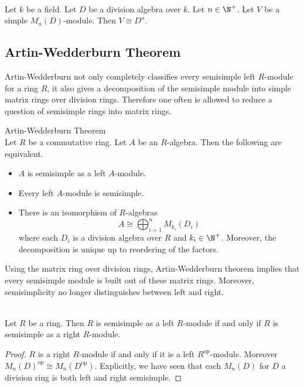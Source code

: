 \documentclass[a4paper]{article}
\begin{document}
\begin{prp}{}{}\\
Let $k$ be a field. Let $D$ be a division algebra over $k$. Let $n\in\N^+$. Let $V$ be a simple $M_n(D)$-module. Then $V\cong D^n$. 
\end{prp}

\subsection{Artin-Wedderburn Theorem}
Artin-Wedderburn not only completely classifies every semisimple left $R$-module for a ring $R$, it also gives a decomposition of the semisimple module into simple matrix rings over division rings. Therefore one often is allowed to reduce a question of semisimple rings into matrix rings. 

\begin{thm}{Artin-Wedderburn Theorem}{}\\
Let $R$ be a commutative ring. Let $A$ be an $R$-algebra. Then the following are equivalent. 
\begin{itemize}
\item $A$ is semisimple as a left $A$-module. 
\item Every left $A$-module is semisimple. 
\item There is an isomorphism of $R$-algebras $$A\cong\bigoplus_{i=1}^nM_{k_i}(D_i)$$ where each $D_i$ is a division algebra over $R$ and $k_i\in\N^+$. Moreover, the decomposition is unique up to reordering of the factors. 
\end{itemize} 
\end{thm}

Using the matrix ring over division rings, Artin-Wedderburn theorem implies that every semisimple module is built out of these matrix rings. Moreover, semisimplicity no longer distinguishes between left and right. 

\begin{crl}{}{}\\
Let $R$ be a ring. Then $R$ is semisimple as a left $R$-module if and only if $R$ is semisimple as a right $R$-module. 
\begin{proof}
$R$ is a right $R$-module if and only if it is a left $R^{\text{op}}$-module. Moreover $M_n(D)^\text{op}\cong M_n(D^\text{op})$. Explicitly, we have seen that each $M_n(D)$ for $D$ a division ring is both left and right semisimple. 
\end{proof}
\end{crl}
\end{document}
